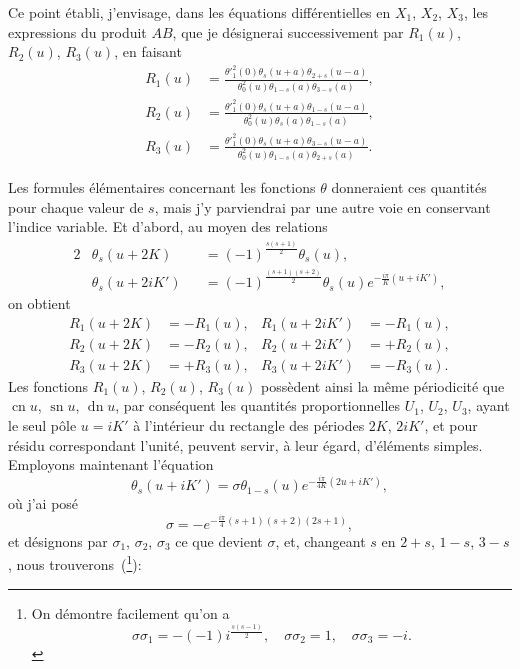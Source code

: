 \documentclass[11pt,leqno,oneside,letterpaper]{book}[2005/09/16]
\DeclareMathOperator{\sn}{sn}
\DeclareMathOperator{\cn}{cn}
\DeclareMathOperator{\dn}{dn}
\begin{document}
Ce point \'etabli, j'envisage, dans les \'equations diff\'erentielles en $X_1$,
$X_2$, $X_3$, les expressions du produit $AB$, que je d\'esignerai successivement
par $R_1(u)$, $R_2(u)$, $R_3(u)$, en faisant
\begin{align*}
R_1(u) &= \frac{\theta'^2_1(0) \theta_s(u + a) \theta_{2+s}(u - a)}{
                \theta_0^2(u) \theta_{1-s}(a) \theta_{3-s}(a)},  \\
R_2(u) &= \frac{\theta'^2_1(0) \theta_s(u + a) \theta_{1-s}(u - a)}{
                \theta_0^2(u) \theta_s(a)     \theta_{1-s}(a)},  \\
R_3(u) &= \frac{\theta'^2_1(0) \theta_s(u + a) \theta_{3-s}(u - a)}{
                \theta_0^2(u) \theta_{1-s}(a) \theta_{2+s}(a)}.
\end{align*}

Les formules \'el\'ementaires concernant les fonctions $\theta$ donneraient ces
quantit\'es pour chaque valeur de $s$, mais j'y parviendrai par une autre
voie en conservant l'indice variable. Et d'abord, au moyen des relations
\begin{alignat*}{2}
&\theta_s(u + 2K)   &&= (-1)^{\frac{s(s+1)}{2}}    \theta_s(u), \\
&\theta_s(u + 2iK') &&= (-1)^{\frac{(s+1)(s+2)}{2}} \theta_s(u) e^{-\frac{i\pi}{K}(u + iK')} ,
\end{alignat*}
on obtient
\begin{align*}
R_1(u + 2K) &= -R_1(u), & R_1(u + 2iK') &= -R_1(u), \\
R_2(u + 2K) &= -R_2(u), & R_2(u + 2iK') &= +R_2(u), \\
R_3(u + 2K) &= +R_3(u), & R_3(u + 2iK') &= -R_3(u).
\end{align*}
Les fonctions $R_1(u)$, $R_2(u)$, $R_3(u)$ poss\`edent ainsi la m\^eme p\'eriodicit\'e que
$\cn u$, $\sn u$, $\dn u$, par cons\'equent les quantit\'es proportionnelles $U_1$, $U_2$, $U_3$,
ayant le seul p\^ole $u = iK'$ \`a l'int\'erieur du rectangle des p\'eriodes $2K$, $2iK'$,
et pour r\'esidu correspondant l'unit\'e, peuvent servir, \`a leur \'egard, d'\'el\'ements
simples. Employons maintenant l'\'equation
\[
\theta_s(u + iK') = \sigma \theta_{1-s}(u) e^{- \frac{i\pi}{4K}(2u + iK')} ,
\]
o\`u j'ai pos\'e
\[
\sigma = -e^{ -\frac{i\pi}{4} (s+1)(s+2)(2s+1) } ,
\]
et d\'esignons par $\sigma_1$, $\sigma_2$, $\sigma_3$ ce que devient $\sigma$, et, changeant $s$ en $2+s$,
$1-s$, $3-s$, nous trouverons~(\footnote{On d\'emontre facilement qu'on a
\[
\sigma\sigma_1 = -(-1)i^{\frac{s(s-1)}{2}},  \quad
\sigma\sigma_2 =  1,  \quad
\sigma\sigma_3 = -i.
\]}):
\end{document}
